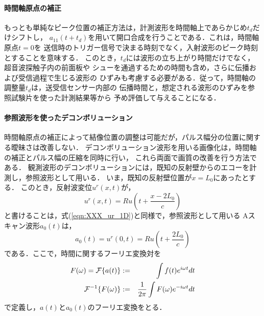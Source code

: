 \paragraph{時間軸原点の補正}
もっとも単純なピーク位置の補正方法は，計測波形を時間軸上であらかじめ$t_d$だけシフトし，
$a_{11}(t+t_d)$を用いて開口合成を行うことである．これは，時間軸原点$t=0$を
送信時のトリガー信号で決まる時刻でなく，入射波形のピーク時刻とすることを意味する．
このとき，$t_d$には波形の立ち上がり時間だけでなく，超音波探触子内の前面板や
シューを通過するための時間も含め，さらに伝播および受信過程で生じる波形の
ひずみも考慮する必要がある．従って，時間軸の調整量$t_d$は，送受信センサー内部の
伝播時間と，想定される波形のひずみを参照試験片を使った計測結果等から
予め評価して与えることになる．
\paragraph{参照波形を使ったデコンボリューション}
時間軸原点の補正によって結像位置の調整は可能だが，パルス幅分の位置に関する曖昧さは改善しない．
デコンボリューション波形を用いる画像化は，時間軸の補正とパルス幅の圧縮を同時に行い，
これら両面で画質の改善を行う方法である．
観測波形のデコンボリューションには，既知の反射壁からのエコーを計測し，参照波形として用いる．
いま，既知の反射壁位置が$x=L_0$にあったとする．
このとき，反射波変位$u^{r}(x,t)$が，
\begin{equation}
	u^{r}(x,t)=Ru\left(t+\frac{x-2L_0}{c}\right)
	\label{eqn:XXX_14}
\end{equation}
と書けることは，式(\ref{eqn:XXX_ur_1D})と同様で，参照波形として用いる
Aスキャン波形$a_0(t)$は，
\begin{equation}
	a_0(t)=u^{r}(0,t)=
	Ru\left(t+\frac{2L_0}{c}\right)
	\label{eqn:XXX_15}
\end{equation}
である．ここで，時間に関するフーリエ変換対を
\begin{eqnarray}
	F(\omega)={\cal F}\{ a(t)\} &:=&  \int f(t)e^{i\omega t} dt \\
	{\cal F}^{-1}\{ F(\omega)\} &:=&  \frac{1}{2\pi} \int F(\omega)e^{-i\omega t} dt 
\end{eqnarray}
で定義し，$a(t)$と$a_0(t)$のフーリエ変換をとる．
